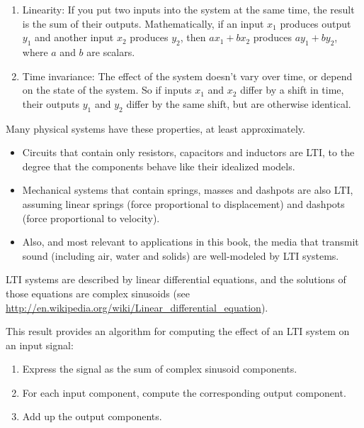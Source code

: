 \documentclass[12pt]{book}
\begin{document}
\begin{enumerate}

\item Linearity: If you put two inputs into the system at the same
  time, the result is the sum of their outputs.  Mathematically, if an
  input $x_1$ produces output $y_1$ and another input $x_2$ produces
  $y_2$, then $a x_1 + b x_2$ produces $a y_1 + b y_2$, where $a$ and
  $b$ are scalars.

\item Time invariance: The
  effect of the system doesn't vary over time, or depend on the state
  of the system.  So if inputs $x_1$ and $x_2$ differ by a shift in time,
  their outputs $y_1$ and $y_2$ differ by the same shift, but are otherwise
  identical.

\end{enumerate}

Many physical systems have these properties, at least approximately.

\begin{itemize}

\item Circuits that contain only resistors, capacitors and inductors are
LTI, to the degree that the components behave like their idealized
models.

\item Mechanical systems that contain springs, masses and
dashpots are also LTI, assuming linear springs (force proportional
to displacement) and dashpots (force proportional to velocity).

\item Also, and most relevant to applications in this book,
the media that transmit sound (including air, water
and solids) are well-modeled by LTI systems.

\end{itemize}

LTI systems are described by linear differential equations, and
the solutions of those equations are complex sinusoids (see
\url{http://en.wikipedia.org/wiki/Linear_differential_equation}).

This result provides an algorithm for computing the effect of
an LTI system on an input signal:

\begin{enumerate}

\item Express the signal as the sum of complex sinusoid components.

\item For each input component, compute the corresponding output component.

\item Add up the output components.

\end{enumerate}
\end{document}
